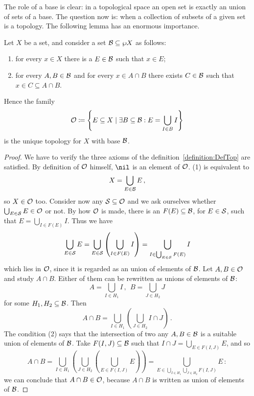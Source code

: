 The role of a base is clear: in a topological space an open set is exactly an union of sets of a base. The question now is: when a collection of subsets of a given set is a topology. The following lemma has an enormous importance.

\begin{theorem}\label{theorem:BaseLemma}
Let \(X\) be a set, and consider a set \(\mathcal B \subseteq \wp X\) as follows:
\begin{enumerate}
\item for every \(x \in X\) there is a \(E \in \mathcal B\) such that \(x \in E\);
\item for every \(A, B \in \mathcal B\) and for every \(x \in A \cap B\) there exists \(C \in \mathcal B\) such that \(x \in C \subseteq A \cap B\).
\end{enumerate}
Hence the family
\[\mathcal O \coloneq \left\{E \subseteq X \mid \exists B \subseteq \mathcal B : E = \bigcup_{I \in B} I\right\}\]
is the unique topology for \(X\) with base \(\mathcal B\).
\end{theorem}

\begin{proof}
We have to verify the three axioms of the definition~\ref{definition:DefTop} are satisfied.\newline
By definition of \(\mathcal O\) himself, \(\nil\) is an element of \(\mathcal O\).\newline
(1) is equivalent to
\[X = \bigcup_{E \in \mathcal B} E\,,\]
so \(X \in \mathcal O\) too.\newline
Consider now any \(\mathcal S \subseteq \mathcal O\) and we ask ourselves whether \(\bigcup_{E \in \mathcal S} E \in \mathcal O\) or not. By how \(\mathcal O\) is made, there is an \(F(E) \subseteq \mathcal B\), for \(E \in \mathcal S\), such that \(E = \bigcup_{I \in F(E)} I\). Thus we have
\[\bigcup_{E \in \mathcal S} E = \bigcup_{E \in \mathcal S} \left(\bigcup_{I \in F(E)} I\right) = \bigcup_{I \in \bigcup_{E \in \mathcal S} F(E)} I\]
which lies in \(\mathcal O\), since it is regarded as an union of elements of \(\mathcal B\).\newline
Let \(A, B \in \mathcal O\) and study \(A \cap B\). Either of them can be rewritten as unions of elements of \(\mathcal B\):
\[A = \bigcup_{I \in H_1} I \,, \ \ B = \bigcup_{J \in H_2} J\]
for some \(H_1, H_2 \subseteq \mathcal B\). Then
\[A \cap B = \bigcup_{I \in H_1} \left(\bigcup_{J \in H_2} I \cap J\right)\,.\]
The condition (2) says that the intersection of two any \(A, B \in \mathcal B\) is a suitable union of elements of \(\mathcal B\). Take \(F(I, J) \subseteq \mathcal B\) such that \(I \cap J = \bigcup_{E \in F(I, J)} E\), and so
\[A \cap B = \bigcup_{I \in H_1} \left( \bigcup_{J \in H_2} \left( \bigcup_{E \in F(I, J)} E \right) \right) = \bigcup_{E \in \bigcup_{I \in H_1} \bigcup_{J \in H_2} F(I, J)} E\,:\]
we can conclude that \(A \cap B \in \mathcal O\), because \(A \cap B\) is written as union of elements of \(\mathcal B\).
\end{proof}

